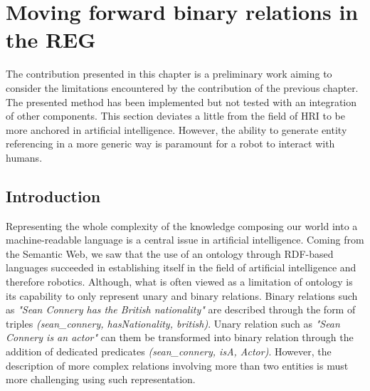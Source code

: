 \ifdefined{}
\else
\setcounter{chapter}{7} %
\dominitoc
\faketableofcontents
\fi

\chapter{Moving forward binary relations in the REG}
\minitoc

The contribution presented in this chapter is a preliminary work aiming to consider the limitations encountered by the contribution of the previous chapter. The presented method has been implemented but not tested with an integration of other components. This section deviates a little from the field of HRI to be more anchored in artificial intelligence. However, the ability to generate entity referencing in a more generic way is paramount for a robot to interact with humans. 

\section{Introduction}

Representing the whole complexity of the knowledge composing our world into a machine-readable language is a central issue in artificial intelligence. Coming from the Semantic Web, we saw that the use of an ontology through RDF-based languages succeeded in establishing itself in the field of artificial intelligence and therefore robotics. Although, what is often viewed as a limitation of ontology is its capability to only represent unary and binary relations. Binary relations such as \textit{"Sean Connery has the British nationality"} are described through the form of triples \textit{(sean\_connery, hasNationality, british)}. Unary relation such as \textit{"Sean Connery is an actor"} can them be transformed into binary relation through the addition of dedicated predicates \textit{(sean\_connery, isA, Actor)}. However, the description of more complex relations involving more than two entities is must more challenging using such representation.


